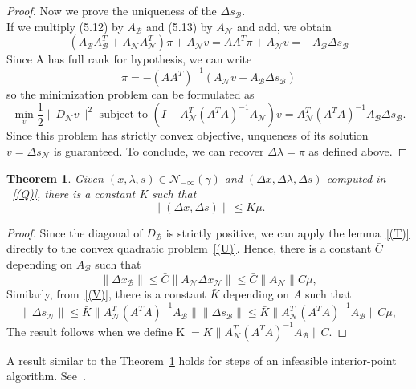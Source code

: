 \documentclass[a4paper,10 pt,titlepage,twoside]{book}
\theoremstyle{plain}
\newtheorem{thm}{Theorem}[chapter]
\theoremstyle{definition}
\theoremstyle{remark}
\begin{document}
\begin{proof}
	 Now we prove the uniqueness of the $\Delta s_{\mathcal{B}}$.\\
	 If we multiply (5.12) by $A_{\mathcal{B}}$ and (5.13) by $A_{\mathcal{N}}$ and add, we obtain
	 \begin{equation*}
	 (A_{\mathcal{B}}A_{\mathcal{B}}^{T}+A_{\mathcal{N}}A_{\mathcal{N}}^{T})\pi+A_{\mathcal{N}}v = AA^{T}\pi+A_{\mathcal{N}}v = -A_{\mathcal{B}}\Delta s_{\mathcal{B}}
	 \end{equation*} 
	 Since A has full rank for hypothesis, we can write
	 \begin{equation*}
	 \pi = -(AA^{T})^{-1}(A_{\mathcal{N}}v +A_{\mathcal{B}}\Delta s_{\mathcal{B}})
	 \end{equation*}
	 so the minimization problem can be formulated as
	 	\begin{equation}\label{(V)}
	 \min\limits_{v}\frac{1}{2}\lVert D_{\mathcal{N}}v\rVert^{2} \text{ subject to }
	 (I-A_{\mathcal{N}}^{T}(A^{T}A)^{-1}A_{\mathcal{N}})v =A_{\mathcal{N}}^{T}(A^{T}A)^{-1}A_{\mathcal{B}}\Delta s_{\mathcal{B}}.		 
	 \end{equation}
	 Since this problem  has strictly convex objective, unqueness of its solution $v=\Delta s_{\mathcal{N}}$ is guaranteed. To conclude, we can recover $\Delta \lambda=\pi$ as defined above. 
\end{proof}
\begin{thm}\label{(Z)}
	Given $(x, \lambda, s)\in\mathcal{N}_{- \infty}(\gamma)$ and $(\Delta x,\Delta \lambda, \Delta s)$ computed in ~\ref{(Q)}, there is a constant K such that
	\begin{equation*}
	\lVert (\Delta x, \Delta s)\rVert \leq K \mu.
	\end{equation*}
\end{thm}
\begin{proof}
	Since the diagonal of $D_{\mathcal{B}}$ is strictly positive, we can apply the lemma~\ref{(T)} directly to the convex quadratic problem~\ref{(U)}. Hence, there is a constant $\bar{C}$ depending on $A_{\mathcal{B}}$ such that
	\begin{equation}
	\lVert \Delta x_{\mathcal{B}}\rVert \leq \bar{C}\lVert A_{\mathcal{N}}\Delta x_{\mathcal{N}}\rVert\leq \bar{C}\lVert A_{\mathcal{N}}\rVert C\mu,
	\end{equation}
	Similarly, from~\ref{(V)}, there is a constant $\bar{K}$ depending on $A$ such that
		\begin{equation}
	\lVert \Delta s_{\mathcal{N}}\rVert \leq \bar{K}\lVert A_{\mathcal{N}}^{T}(A^{T}A)^{-1}A_{\mathcal{B}}\rVert\lVert \Delta s_{\mathcal{B}}\rVert \leq\bar{K} \lVert A_{\mathcal{N}}^{T}(A^{T}A)^{-1}A_{\mathcal{B}}\rVert C\mu,
	\end{equation}
	The result follows when we define K$\;=\bar{K} \lVert A_{\mathcal{N}}^{T}(A^{T}A)^{-1}A_{\mathcal{B}}\rVert C$.
\end{proof}
A result similar to the Theorem~\ref{(Z)} holds for steps of an infeasible interior-point algorithm. See~\cite{Wright}.
\end{document}
